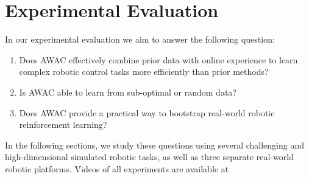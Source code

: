 \section{Experimental Evaluation}\label{sec:experiments}
In our experimental evaluation we aim to answer the following question: 

\begin{enumerate}
    \item Does AWAC effectively combine prior data with online experience to learn complex robotic control tasks more efficiently than prior methods?
    \item Is AWAC able to learn from sub-optimal or random data?
    \item Does AWAC provide a practical way to bootstrap real-world robotic reinforcement learning?
\end{enumerate}
\noindent In the following sections, we study these questions using several challenging and high-dimensional simulated robotic tasks, as well as three separate real-world robotic platforms.
Videos of all experiments are available at \projectpage

